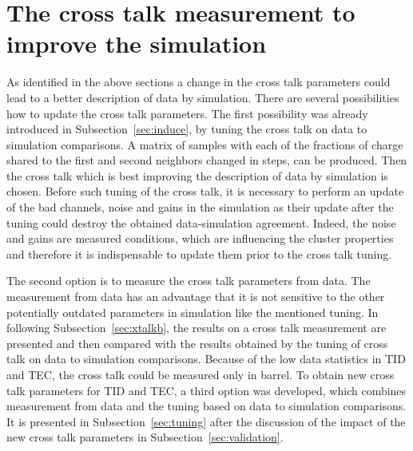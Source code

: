 
\newpage

\section{The cross talk measurement to improve the simulation~\label{sec:xtalk}}

As identified in the above sections a change in the cross talk parameters could lead to a better description of data by simulation. There are several possibilities how to update the cross talk parameters. The first possibility was already introduced in Subsection~\ref{sec:induce}, by tuning the cross talk on data to simulation comparisons. A matrix of samples with each of the fractions of charge shared to the first and second neighbors changed in steps, can be produced. Then the cross talk which is best improving the description of data by simulation is chosen. Before such tuning of the cross talk, it is necessary to perform an update of the bad channels, noise and gains in the simulation as their update after the tuning could destroy the obtained data-simulation agreement. Indeed, the noise and gains are measured conditions, which are influencing the cluster properties and therefore it is indispensable to update them prior to the cross talk tuning.


The second option is to measure the cross talk parameters from data. The measurement from data has an advantage that it is not sensitive to the other potentially outdated parameters in simulation like the mentioned tuning. In following Subsection~\ref{sec:xtalkb}, the results on a cross talk measurement are presented and then compared with the results obtained by the tuning of cross talk on data to simulation comparisons. Because of the low data statistics in TID and TEC, the cross talk could be measured only in barrel. To obtain new cross talk parameters for TID and TEC, a third option was developed, which combines measurement from data and the tuning based on data to simulation comparisons. It is presented in Subsection~\ref{sec:tuning} after the discussion of the impact of the new cross talk parameters in Subsection~\ref{sec:validation}.


